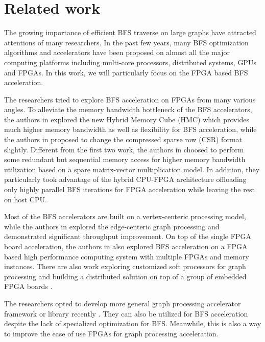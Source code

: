 \section{Related work} \label{sec:relatedwork}
The growing importance of efficient BFS traverse on large graphs 
have attracted attentions of many researchers. In the past few years, 
many BFS optimization algorithms and accelerators have been proposed 
on almost all the major computing platforms including multi-core processors, 
distributed systems, GPUs and FPGAs. In this work, we will 
particularly focus on the FPGA based BFS acceleration. 

The researchers tried to explore BFS acceleration 
on FPGAs from many various angles.
To alleviate the memory bandwidth bottleneck of the 
BFS accelerators, the authors in \cite{zhang2017boosting, khoram2018accelerating} 
explored the new Hybrid Memory Cube (HMC) which provides 
much higher memory bandwidth as well as flexibility for BFS 
acceleration, while the authors in \cite{attia2014cygraph} 
proposed to change the compressed sparse row (CSR) format slightly. 
Different from the first two work, the authors in \cite{umuroglu2015hybrid} 
choosed to perform some redundant but sequential memory access for higher memory bandwidth 
utilization based on a spare matrix-vector multiplication model.
In addition, they particularly took advantage of the 
hybrid CPU-FPGA architecture offloading only highly parallel 
BFS iterations for FPGA acceleration while leaving the rest 
on host CPU.  

Most of the BFS accelerators are built on a vertex-centeric 
processing model, while the authors 
in \cite{zhou2016high} explored the edge-centeric graph processing and demonstrated 
significant throughput improvement. On top of the single FPGA board acceleration, 
the authors in \cite{attia2014cygraph, betkaoui2012reconfigurable} also explored 
BFS acceleration on a FPGA based high performance computing system with multiple 
FPGAs and memory instances. There are also work exploring customized soft processors 
for graph processing and building a distributed solution on 
top of a group of embedded FPGA boards \cite{kapre2015custom, wang2010message}.

The researchers opted to develop 
more general graph processing accelerator framework or library 
recently \cite{engelhardt2016gravf, jun2018grafboost, yao2018efficient, oguntebi2016graphops, Dai2017foregraph, dai2016fpgp}. 
They can also be utilized for BFS acceleration despite the lack of 
specialized optimization for BFS. Meanwhile, this is also a way to improve 
the ease of use FPGAs for graph processing acceleration.


